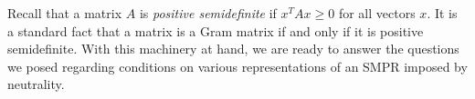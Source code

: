 \documentclass[prodmode]{acmsmall-ec14}
\newcommand{\calL}{{\mathcal{L}}}
\newcommand{\rank}{{\calL(A)}}
\begin{document}
%
Recall that a matrix $A$ is \emph{positive semidefinite} if $x^T A x \geq 0$ for all vectors $x$. It is a standard fact that a matrix is a Gram matrix if and only if it is positive semidefinite. 
With this machinery at hand, we are ready to answer the questions we posed regarding conditions on various representations of an SMPR imposed by neutrality. 
%

\end{document}
